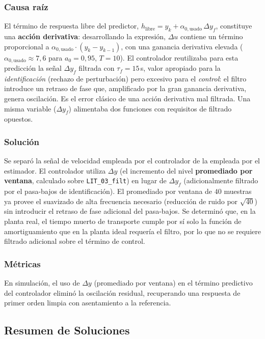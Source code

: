 \subsubsection{Causa raíz}
El término de respuesta libre del predictor, $h_{\text{libre}} = y_k + \alpha_{0,\text{usado}}\,\Delta y_f$, constituye una \textbf{acción derivativa}: desarrollando la expresión, $\Delta u$ contiene un término proporcional a $\alpha_{0,\text{usado}}\cdot(y_k - y_{k-1})$, con una ganancia derivativa elevada ($\alpha_{0,\text{usado}} \approx 7{,}6$ para $a_0=0{,}95$, $T=10$). El controlador reutilizaba para esta predicción la señal $\Delta y_f$ filtrada con $\tau_f = 15\,$s, valor apropiado para la \textit{identificación} (rechazo de perturbación) pero excesivo para el \textit{control}: el filtro introduce un retraso de fase que, amplificado por la gran ganancia derivativa, genera oscilación. Es el error clásico de una acción derivativa mal filtrada. Una misma variable ($\Delta y_f$) alimentaba dos funciones con requisitos de filtrado opuestos.

\subsubsection{Solución}
Se separó la señal de velocidad empleada por el controlador de la empleada por el estimador. El controlador utiliza $\Delta y$ (el incremento del nivel \textbf{promediado por ventana}, calculado sobre \texttt{LIT\_03\_filt}) en lugar de $\Delta y_f$ (adicionalmente filtrado por el pasa-bajos de identificación). El promediado por ventana de $40$ muestras ya provee el suavizado de alta frecuencia necesario (reducción de ruido por $\sqrt{40}$) sin introducir el retraso de fase adicional del pasa-bajos. Se determinó que, en la planta real, el tiempo muerto de transporte cumple por sí solo la función de amortiguamiento que en la planta ideal requería el filtro, por lo que no se requiere filtrado adicional sobre el término de control.

\subsubsection{Métricas}
En simulación, el uso de $\Delta y$ (promediado por ventana) en el término predictivo del controlador eliminó la oscilación residual, recuperando una respuesta de primer orden limpia con asentamiento a la referencia.

\subsection{Resumen de Soluciones}

